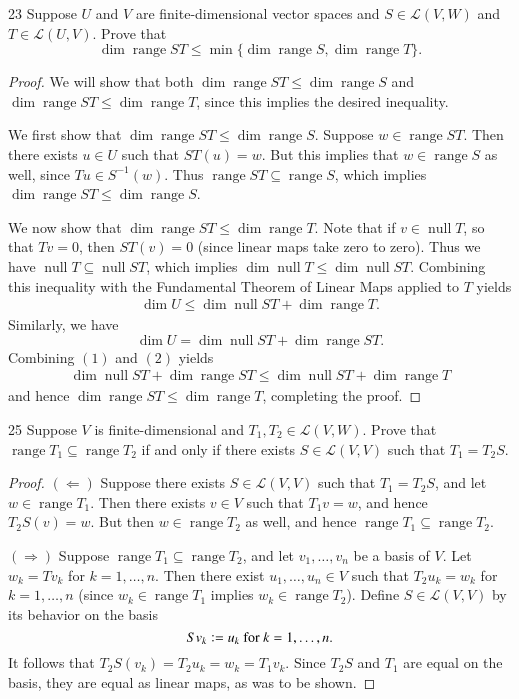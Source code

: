 \documentclass[11pt]{extarticle}
\newenvironment{problem}[1]{\begin{prob*}{#1}{}}{\end{prob*}}
\newcommand{\Hom}{\mathcal{L}}
\DeclareMathOperator{\Null}{null}
\DeclareMathOperator{\Range}{range}
\newcommand{\defeq}{\vcentcolon=}
\begin{document}
\begin{problem}{23}
Suppose $U$ and $V$ are finite-dimensional vector spaces and $S\in\Hom(V,W)$ and $T\in\Hom(U,V)$.  Prove that
\begin{equation*}
\dim\Range ST \leq \min\{\dim\Range S, \dim\Range T\}.
\end{equation*}
\end{problem}
\begin{proof}
We will show that both $\dim\Range ST \leq \dim \Range S$ and $\dim\Range ST \leq \dim \Range T$, since this implies the desired inequality.
\par We first show that $\dim\Range ST \leq \dim \Range S$.  Suppose $w \in \Range ST$.  Then there exists $u\in U$ such that $ST(u) = w$.  But this implies that $w\in\Range S$ as well, since $Tu\in S^{-1}(w)$.  Thus $\Range ST \subseteq \Range S$, which implies $\dim \Range ST \leq \dim\Range S$.
\par We now show that $\dim\Range ST \leq \dim \Range T$.  Note that if $v\in\Null T$, so that $Tv =0$, then $ST(v) = 0$ (since linear maps take zero to zero).  Thus we have $\Null T\subseteq \Null ST$, which implies $\dim \Null T\leq \dim \Null ST$.  Combining this inequality with the Fundamental Theorem of Linear Maps applied to $T$ yields
\begin{align}
\dim U \leq \dim \Null ST + \dim \Range T.
\end{align}
Similarly, we have
\begin{equation}
\dim U = \dim\Null ST + \dim\Range ST.
\end{equation}
Combining $(1)$ and $(2)$ yields
\begin{align*}
\dim\Null ST + \dim\Range ST \leq \dim\Null ST + \dim\Range T
\end{align*}
and hence $\dim\Range ST \leq \dim\Range T$, completing the proof.
\end{proof}

\begin{problem}{25}
Suppose $V$ is finite-dimensional and $T_1,T_2\in\Hom(V,W)$.  Prove that $\Range T_1\subseteq \Range T_2$ if and only if there exists $S\in\Hom(V,V)$ such that $T_1= T_2S$.  
\end{problem}
\begin{proof}
$(\Leftarrow)$ Suppose there exists $S\in\Hom(V,V)$ such that $T_1=T_2S$, and let $w\in\Range T_1$.  Then there exists $v\in V$ such that $T_1v = w$, and hence $T_2S(v) = w$.  But then $w \in\Range T_2$ as well, and hence $\Range T_1\subseteq \Range T_2$.
\par $(\Rightarrow)$  Suppose $\Range T_1\subseteq \Range T_2$, and let $v_1,\dots, v_n$ be a basis of $V$.  Let $w_k = Tv_k$ for $k=1,\dots, n$.  Then there exist $u_1,\dots,u_n\in V$ such that $T_2u_k = w_k$ for $k=1,\dots,n$ (since $w_k\in\Range T_1$ implies $w_k\in\Range T_2$).  Define $S\in\Hom(V,V)$ by its behavior on the basis
\begin{equation*}
Sv_k \defeq u_k \text{ for }k= 1,\dots, n.
\end{equation*}
It follows that $T_2S(v_k) = T_2u_k = w_k = T_1v_k$.  Since $T_2S$ and $T_1$ are equal on the basis, they are equal as linear maps, as was to be shown.
\end{proof}
\end{document}
